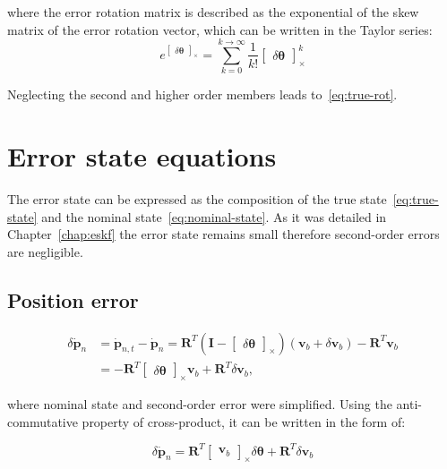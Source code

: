 where the error rotation matrix is described as the exponential of the skew matrix of the error rotation vector, which can be written in the Taylor series:
\begin{equation}
    e^{\begin{bmatrix}\delta\boldsymbol{\theta} \end{bmatrix}_\times} = \sum_{k=0}^{k\rightarrow\infty}\frac{1}{k!}\begin{bmatrix}\delta\boldsymbol{\theta}\end{bmatrix}_\times^k
\end{equation}

Neglecting the second and higher order members leads to~\eqref{eq:true-rot}.

\section{Error state equations}\label{app:eskf-eqs}

The error state can be expressed as the composition of the true state~\eqref{eq:true-state} and the nominal state~\eqref{eq:nominal-state}. As it was detailed in Chapter~\ref{chap:eskf} the error state remains small therefore second-order errors are negligible.

\subsection{Position error}

\begin{equation}
\begin{aligned}
    \delta\dot{\mathbf{p}}_n&=\mathbf{\dot{p}}_{n,t}-\mathbf{\dot{p}}_n=\mathbf{R}^T\left(\mathbf{I} -\begin{bmatrix} \delta\boldsymbol{\theta} \end{bmatrix}_\times\right) (\mathbf{v}_b+\delta\mathbf{v}_b)-\mathbf{R}^T\mathbf{v}_b \\
    &= -\mathbf{R}^T\begin{bmatrix} \delta\boldsymbol{\theta} \end{bmatrix}_\times\mathbf{v}_b+ \mathbf{R}^T\delta\mathbf{v}_b, 
\end{aligned}
\end{equation}

where nominal state and second-order error were simplified. Using the anti-commutative property of cross-product, it can be written in the form of:

\begin{tcolorbox}
\begin{equation}
    \delta\dot{\mathbf{p}}_n = \mathbf{R}^T\begin{bmatrix} \mathbf{v}_b \end{bmatrix}_\times \delta\boldsymbol{\theta} + \mathbf{R}^T\delta\mathbf{v}_b
\end{equation}
\end{tcolorbox}

